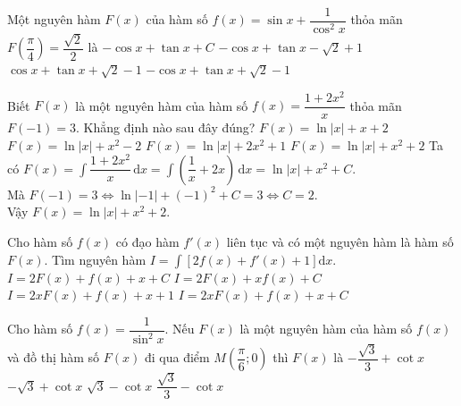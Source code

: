 \begin{ex}%
	Một nguyên hàm $F(x)$ của hàm số $f(x)=\sin x+\dfrac{1}{\cos^2 x}$ thỏa mãn $F\left(\dfrac{\pi}{4}\right)=\dfrac{\sqrt2}{2}$ là 
	\choice
	{ $-\cos x+\tan x+C$}	
	{$-\cos x+\tan x-\sqrt2 +1$}
	{$\cos x+\tan x+\sqrt2 -1$}
	{\True $-\cos x+\tan x+\sqrt2 -1$}
\end{ex}

\begin{ex}%
	Biết $F(x)$ là một nguyên hàm của hàm số $f(x)=\dfrac{1+2x^2}{x}$ thỏa mãn $F(-1)=3$. Khẳng định nào sau đây đúng?
	\choice
	{$F(x)=\ln|x|+x+2$}
	{$F(x)=\ln|x|+x^2-2$}
	{$F(x)=\ln|x|+2x^2+1$}
	{\True $F(x)=\ln|x|+x^2+2$}
	\loigiai
	{
		Ta có $F(x)=\displaystyle\int \dfrac{1+2x^2}{x}\mathrm{\,d}x=\displaystyle\int \left(\dfrac{1}{x}+2x\right)\mathrm{\,d}x=\ln|x|+x^2+C$.\\
		Mà $F(-1)=3\Leftrightarrow \ln|-1|+(-1)^2+C=3\Leftrightarrow C=2$.\\
		Vậy $F(x)=\ln|x|+x^2+2$.
	}
\end{ex}

\begin{ex}%
	Cho hàm số $ f(x) $ có đạo hàm $ f'(x) $ liên tục và có một nguyên hàm là hàm số $ F(x) $. Tìm nguyên hàm $ I=\displaystyle\int \left[2f(x)+f'(x)+1\right]\mathrm{d}x $.
	\choice
	{\True $ I=2F(x)+f(x)+x+C $}
	{$ I=2F(x)+xf(x)+C $}
	{$ I=2xF(x)+f(x)+x+1 $}
	{$ I=2xF(x)+f(x)+x+C $}
\end{ex}
\begin{ex}%
	Cho hàm số $ f(x)=\dfrac{1}{\sin^2 x} $. Nếu $ F(x) $ là một nguyên hàm của hàm số $ f(x) $ và đồ thị hàm số $ F(x) $ đi qua điểm $ M\left(\dfrac{\pi
	}{6}; 0\right) $ thì $ F(x) $ là
	\choice
	{$ -\dfrac{\sqrt{3}}{3}+\cot x $}
	{$ -\sqrt{3}+\cot x $}
	{\True $ \sqrt{3}-\cot x $}
	{$ \dfrac{\sqrt{3}}{3}-\cot x $}
\end{ex}

